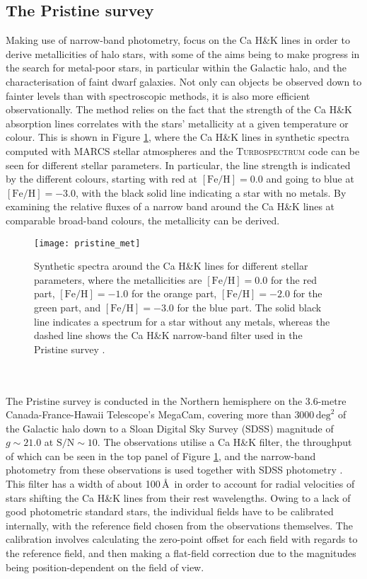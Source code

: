 \documentclass[a4paper,11pt]{article}
\begin{document}
\subsection{The Pristine survey} \label{pristine}
Making use of narrow-band photometry, \citet{pristine} focus on the Ca H\&K lines in order to derive metallicities of halo stars, with some of the aims being to make progress in the search for metal-poor stars, in particular within the Galactic halo, and the characterisation of faint dwarf galaxies. Not only can objects be observed down to fainter levels than with spectroscopic methods, it is also more efficient observationally. The method relies on the fact that the strength of the Ca H\&K absorption lines correlates with the stars' metallicity at a given temperature or colour. This is shown in Figure \ref{fig:pristine_hk}, where the Ca H\&K lines in synthetic spectra computed with \textsc{MARCS} stellar atmospheres \citep{marcs} and the \textsc{Turbospectrum} code \citep{turbospectrum} can be seen for different stellar parameters. In particular, the line strength is indicated by the different colours, starting with red at $\mathrm{[Fe/H]}=0.0$ and going to blue at $\mathrm{[Fe/H]}=-3.0$, with the black solid line indicating a star with no metals. By examining the relative fluxes of a narrow band around the Ca H\&K lines at comparable broad-band colours, the metallicity can be derived.
%
\begin{figure}[ht]
 \centering
 \texttt{[image: pristine\_met]}
 \caption[Ca H\&K lines for different stellar parameters]{Synthetic spectra around the Ca H\&K lines for different stellar parameters, where the metallicities are $\mathrm{[Fe/H]}=0.0$ for the red part, $\mathrm{[Fe/H]}=-1.0$ for the orange part, $\mathrm{[Fe/H]}=-2.0$ for the green part, and $\mathrm{[Fe/H]}=-3.0$ for the blue part. The solid black line indicates a spectrum for a star without any metals, whereas the dashed line shows the Ca H\&K narrow-band filter used  in the Pristine survey \citep{pristine}.}
 \label{fig:pristine_hk}
\end{figure}\\ \\
%
The Pristine survey is conducted in the Northern hemisphere on the 3.6-metre Canada-France-Hawaii Telescope’s MegaCam, covering more than $3000\,\mathrm{deg}^2$ of the Galactic halo down to a Sloan Digital Sky Survey (SDSS) magnitude of $g\sim21.0$ at $\mathrm{S/N}\sim10$. The observations utilise a Ca H\&K filter, the throughput of which can be seen in the top panel of Figure \ref{fig:pristine_hk}, and the narrow-band photometry from these observations is used together with SDSS photometry \citep[e.g.,][]{sdss}. This filter has a width of about 100\,\AA\ in order to account for radial velocities of stars shifting the Ca H\&K lines from their rest wavelengths. Owing to a lack of good photometric standard stars, the individual fields have to be calibrated internally, with the reference field chosen from the observations themselves. The calibration involves calculating the zero-point offset for each field with regards to the reference field, and then making a flat-field correction due to the magnitudes being position-dependent on the field of view.\\ \\
\end{document}
